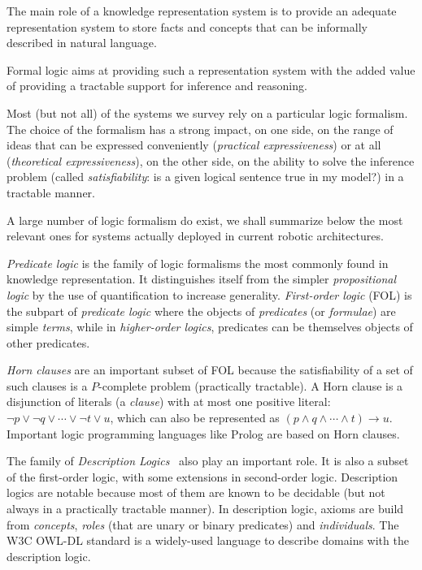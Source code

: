 The main role of a knowledge representation system is to provide an adequate
representation system to store facts and concepts that can be informally
described in natural language.

Formal logic aims at providing such a representation system with the added
value of providing a tractable support for inference and reasoning.

Most (but not all) of the systems we survey rely on a particular logic
formalism. The choice of the formalism has a strong impact, on one side, on the
range of ideas that can be expressed conveniently (\emph{practical
expressiveness}) or at all (\emph{theoretical expressiveness}), on the other
side, on the ability to solve the inference problem (called
\emph{satisfiability}: is a given logical sentence true in my model?) in a
tractable manner.

A large number of logic formalism do exist, we shall summarize below the most
relevant ones for systems actually deployed in current robotic architectures.

\emph{Predicate logic} is the family of logic formalisms the most commonly
found in knowledge representation. It distinguishes itself from the simpler
\emph{propositional logic} by the use of quantification to increase generality.
\emph{First-order logic} (FOL) is the subpart of \emph{predicate logic} where the
objects of \emph{predicates} (or \emph{formulae}) are simple \emph{terms},
while in \emph{higher-order logics}, predicates can be themselves objects of
other predicates.

\emph{Horn clauses} are an important subset of FOL because the satisfiability
of a set of such clauses is a $P$-complete problem (\ie practically tractable).
A Horn clause is a disjunction of literals (a \emph{clause}) with at most one
positive literal: $\neg p \lor \neg q \lor \cdots \lor \neg t \lor u$, which
can also be represented as $(p \land q \land \cdots \land t) \rightarrow u$.
Important logic programming languages like Prolog are based on Horn clauses.

The family of \emph{Description Logics}~\cite{Baader2008} also play an
important role. It is also a subset of the first-order logic, with some
extensions in second-order logic. Description logics are notable because most
of them are known to be decidable (but not always in a practically tractable
manner). In description logic, axioms are build from \emph{concepts},
\emph{roles} (that are unary or binary predicates) and \emph{individuals}. The
W3C OWL-DL standard is a widely-used language to describe domains with the
description logic.

